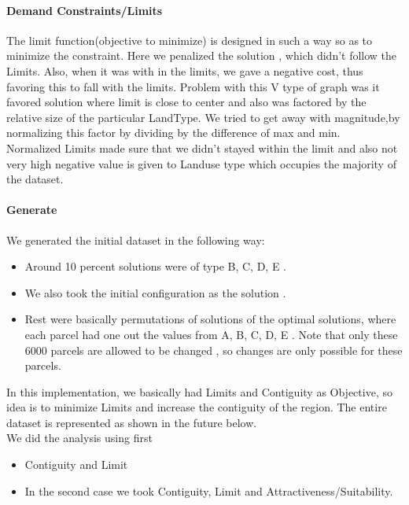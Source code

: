 \documentclass{sig-alternate}
\begin{document}
\paragraph{Demand Constraints/Limits} The limit function(objective to minimize) is designed in such a way so as to minimize the constraint. Here we penalized the solution , which didn't follow the Limits. Also,  when it was with in the limits, we gave a negative cost, thus favoring this to fall with the limits. Problem with this V type of graph was it favored solution where limit is close to center and also was factored by the relative size of the particular LandType. We tried to get away with magnitude,by normalizing this factor by dividing by the difference of max and min.\\ Normalized Limits made sure that we didn't stayed within the limit and also not very high negative value is given to Landuse type which occupies the majority of the dataset.\\
\paragraph{Generate} We generated the initial dataset in the following way:
\begin{itemize}
\item Around 10 percent solutions were of type B, C, D, E .
\item We also took the initial configuration as the solution .
\item Rest were basically permutations of solutions of the optimal solutions, where each parcel had one out the values from A, B, C, D, E . Note that only these 6000 parcels are allowed to be changed , so changes are only possible for these parcels.
 \end{itemize}
In this implementation, we basically had Limits and Contiguity as Objective, so idea is to minimize Limits and increase the contiguity of the region. The entire dataset is represented as shown in the future below. \\
We did the analysis using first 
\begin{itemize} \item Contiguity and Limit 
\item  In the second case we took Contiguity, Limit and Attractiveness/Suitability.
\end{itemize}
\end{document}
